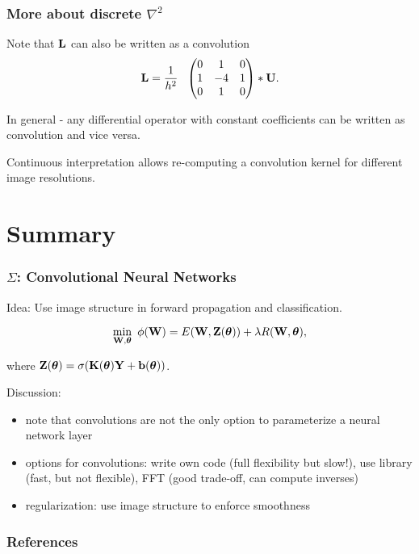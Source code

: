 \documentclass[12pt,fleqn,handout]{beamer}
\begin{document}
\begin{frame}[fragile]\frametitle{More about discrete $\nabla^2$}

Note that ${\bf L}$ can also be written as a convolution
$$ \bfL = {\frac 1 {h^2}}\ \  \begin{pmatrix} 0  &  1  &  0 \\ 1  & -4  & 1 \\ 0  & 1  & 0 \end{pmatrix} * \bfU. $$

In general - any differential operator with constant coefficients can be written
as convolution and vice versa.

\bigskip

Continuous interpretation allows re-computing a convolution kernel for different image resolutions.


\end{frame}

\section{Summary} %
\label{sec:numerical_optimization}
\begin{frame}[fragile]\frametitle{$\Sigma$: Convolutional Neural Networks}

Idea: Use image structure in forward propagation and classification. 

$$ \min_{{\bf W},{\boldsymbol \theta}} \ \phi({\bf W}) = E({\bf W},{\bf Z}({\boldsymbol \theta})) + \lambda R({\bf W},{\boldsymbol \theta}),$$

where ${\bf Z}({\boldsymbol \theta}) = \sigma({\bf K}({\boldsymbol \theta}){\bf Y}+{\bf b}({\boldsymbol \theta})) $.

Discussion:
\begin{itemize}
	\item note that convolutions are not the only option to parameterize a neural network layer
	\item options for convolutions: write own code (full flexibility but slow!), use library (fast, but not flexible), FFT (good trade-off, can compute inverses) 
	\item regularization: use image structure to enforce smoothness
\end{itemize}
\end{frame}



\begin{frame}[allowframebreaks]
	\frametitle{References}



\end{frame}
\end{document}
